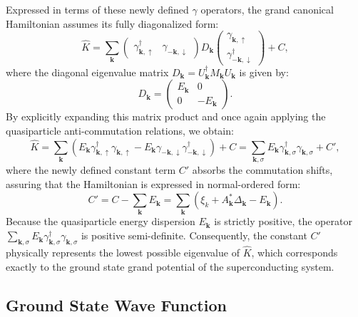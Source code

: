 Expressed in terms of these newly defined \( \gamma \) operators, the grand canonical Hamiltonian assumes its fully diagonalized form:
\[
    \hat{K} = \sum_{\mathbf{k}} \begin{pmatrix} \gamma_{\mathbf{k},\uparrow}^\dagger & \gamma_{-\mathbf{k},\downarrow} \end{pmatrix} D_{\mathbf{k}} \begin{pmatrix} \gamma_{\mathbf{k},\uparrow} \\ \gamma_{-\mathbf{k},\downarrow}^\dagger \end{pmatrix} + C,
\]
where the diagonal eigenvalue matrix \( D_{\mathbf{k}} = U_{\mathbf{k}}^\dagger M_{\mathbf{k}} U_{\mathbf{k}} \) is given by:
\[
    D_{\mathbf{k}} = \begin{pmatrix} E_{\mathbf{k}} & 0 \\ 0 & -E_{\mathbf{k}} \end{pmatrix}.
\]
By explicitly expanding this matrix product and once again applying the quasiparticle anti-commutation relations, we obtain:
\begin{equation} \label{eq:diagonalized_canonical_hamiltonian}
    \hat{K} = \sum_{\mathbf{k}} \left( E_{\mathbf{k}} \gamma_{\mathbf{k},\uparrow}^\dagger \gamma_{\mathbf{k},\uparrow} - E_{\mathbf{k}} \gamma_{-\mathbf{k},\downarrow} \gamma_{-\mathbf{k},\downarrow}^\dagger \right) + C = \sum_{\mathbf{k},\sigma} E_{\mathbf{k}} \gamma_{\mathbf{k},\sigma}^\dagger \gamma_{\mathbf{k},\sigma} + C',
\end{equation}
where the newly defined constant term \( C' \) absorbs the commutation shifts, assuring that the Hamiltonian is expressed in normal-ordered form:
\[
    C' = C - \sum_{\mathbf{k}} E_{\mathbf{k}} = \sum_{\mathbf{k}} \left( \xi_k + A_{\mathbf{k}}^* \Delta_{\mathbf{k}} - E_{\mathbf{k}} \right).
\]
Because the quasiparticle energy dispersion \( E_{\mathbf{k}} \) is strictly positive, the operator \( \sum_{\mathbf{k},\sigma} E_{\mathbf{k}} \gamma_{\mathbf{k},\sigma}^\dagger \gamma_{\mathbf{k},\sigma} \) is positive semi-definite. Consequently, the constant \( C' \) physically represents the lowest possible eigenvalue of \( \hat{K} \), which corresponds exactly to the ground state grand potential of the superconducting system.

\subsection{Ground State Wave Function}

